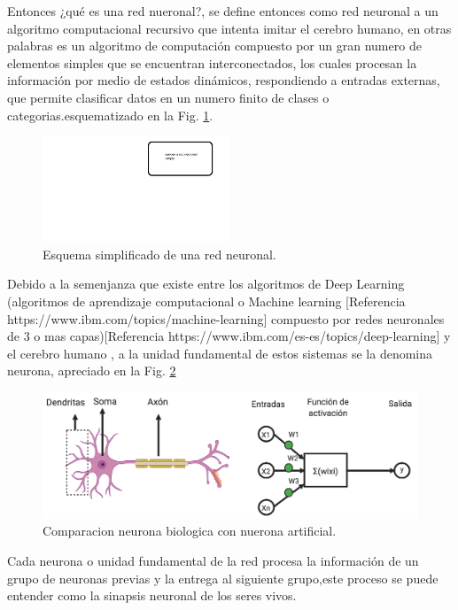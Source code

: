 Entonces ¿qué es una red nueronal?, se define entonces como red neuronal a un algoritmo computacional recursivo que intenta imitar el cerebro
humano, en otras palabras es un algoritmo de computación compuesto por un gran numero de elementos simples que se
encuentran interconectados, los cuales procesan la información por medio de estados dinámicos, respondiendo a entradas externas, que permite
clasificar datos en un numero finito de clases o categorias.esquematizado en
la Fig. \ref{fig:esquema-redes}.
\begin{figure}[h]
    \centering
    \includegraphics[width=0.5\textwidth]{imgs/Redes-esquema.jpg}
    \caption{Esquema simplificado de una red neuronal.}
    \label{fig:esquema-redes}
\end{figure}
Debido a la semenjanza que existe entre los algoritmos de Deep Learning (algoritmos de aprendizaje computacional o
Machine learning [Referencia https://www.ibm.com/topics/machine-learning] compuesto por redes neuronales
de 3 o mas capas)[Referencia https://www.ibm.com/es-es/topics/deep-learning] y el cerebro humano , a la
unidad fundamental de estos sistemas se la denomina neurona, apreciado en la Fig. \ref{fig:comparativa-neuronas}
\begin{figure}[h]
    \centering
    \includegraphics[width=1\textwidth]{imgs/comparacion-neurona-red.png}
    \caption{Comparacion neurona biologica con nuerona artificial.}
    \label{fig:comparativa-neuronas}
\end{figure}
Cada neurona o unidad fundamental de la red procesa la información de un grupo de neuronas previas y la entrega al siguiente grupo,este proceso
se puede entender como la sinapsis neuronal de los seres vivos.

